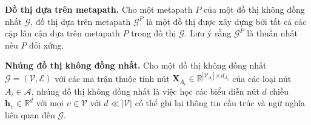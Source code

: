 \begin{definition}
  \textbf{Đồ thị dựa trên metapath.} Cho một metapath $P$ của một đồ thị không đồng nhất $\pmb{\mathcal{G}}$, đồ thị dựa trên metapath $\pmb{\mathcal{G}}^P$ là một đồ thị được xây dựng bởi tất cả các cặp lân cận dựa trên metapath $P$ trong đồ thị $\pmb{\mathcal{G}}$. Lưu ý rằng $\pmb{\mathcal{G}}^P$ là thuần nhất nếu $P$ đối xứng.
\end{definition}

\begin{definition}
  \textbf{Nhúng đồ thị không đồng nhất.} Cho một đồ thị không đồng nhất $\pmb{\mathcal{G}} = (\pmb{\mathcal{V}}, \pmb{\mathcal{E}})$ với các ma trận thuộc tính nút $\pmb{X}_{A_i} \in \mathbb{R} ^ {|\pmb{\mathcal{V}}_{A_i}| \times d_{A_i}}$ của các loại nút $A_i \in \pmb{\mathcal{A}}$, nhúng đồ thị không đồng nhất là việc học các biểu diễn nút $d$ chiều $\pmb{h}_{\upsilon} \in \mathbb{R}^d$ với mọi $\upsilon \in \pmb{\mathcal{V}}$ với $d \ll |\pmb{\mathcal{V}}|$ có thể ghi lại thông tin cấu trúc và ngữ nghĩa liên quan đến $\pmb{\mathcal{G}}$.
\end{definition}




